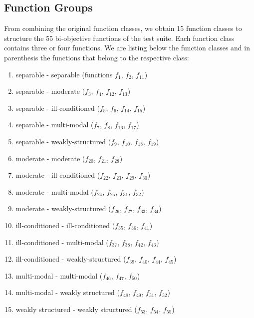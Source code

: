 \documentclass[letterpaper,12pt,english]{article}
\begin{document}
\subsection{Function Groups}
\label{index:function-groups}
From combining the original  function classes, we obtain 15 function
classes to structure the 55 bi-objective functions of the  test
suite. Each function class contains three or four functions. We are listing
below the function classes and in parenthesis  the functions that belong to
the respective class:
\begin{enumerate}
\item {} 
separable - separable (functions \(f_1\), \(f_2\), \(f_{11}\))

\item {} 
separable - moderate (\(f_3\), \(f_4\), \(f_{12}\), \(f_{13}\))

\item {} 
separable - ill-conditioned (\(f_5\), \(f_6\), \(f_{14}\), \(f_{15}\))

\item {} 
separable - multi-modal (\(f_7\), \(f_8\), \(f_{16}\), \(f_{17}\))

\item {} 
separable - weakly-structured (\(f_9\), \(f_{10}\), \(f_{18}\), \(f_{19}\))

\item {} 
moderate - moderate (\(f_{20}\), \(f_{21}\), \(f_{28}\))

\item {} 
moderate - ill-conditioned (\(f_{22}\), \(f_{23}\), \(f_{29}\), \(f_{30}\))

\item {} 
moderate - multi-modal (\(f_{24}\), \(f_{25}\), \(f_{31}\), \(f_{32}\))

\item {} 
moderate - weakly-structured (\(f_{26}\), \(f_{27}\), \(f_{33}\), \(f_{34}\))

\item {} 
ill-conditioned - ill-conditioned (\(f_{35}\), \(f_{36}\), \(f_{41}\))

\item {} 
ill-conditioned - multi-modal (\(f_{37}\), \(f_{38}\), \(f_{42}\), \(f_{43}\))

\item {} 
ill-conditioned - weakly-structured (\(f_{39}\), \(f_{40}\), \(f_{44}\), \(f_{45}\))

\item {} 
multi-modal - multi-modal (\(f_{46}\), \(f_{47}\), \(f_{50}\))

\item {} 
multi-modal - weakly structured (\(f_{48}\), \(f_{49}\), \(f_{51}\), \(f_{52}\))

\item {} 
weakly structured - weakly structured (\(f_{53}\), \(f_{54}\), \(f_{55}\))

\end{enumerate}
\end{document}
